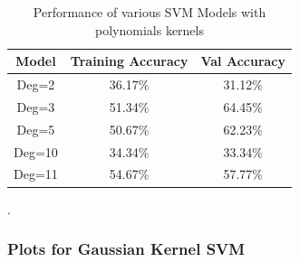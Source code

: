 \newpage
{
\begin{table}[!h]
\centering
\begin{tabular}{ |c|c|c|  }
\hline
\rowcolor{lightgray} Model & Training Accuracy & Val Accuracy\\
\hline
Deg=2 & 36.17$\%$  & 31.12$\%$  \\ 
\hline
Deg=3 & 51.34$\%$  & 64.45$\%$  \\ 
\hline
Deg=5 & 50.67$\%$  & 62.23$\%$  \\ 
\hline
Deg=10 & 34.34$\%$  & 33.34$\%$  \\ 
\hline
Deg=11 & 54.67$\%$  & 57.77$\%$  \\ 
\hline
\end{tabular}
\caption{Performance of various SVM Models with polynomials kernels}.
\label{table:3}
\end{table}
}

\subsubsection{Plots for Gaussian Kernel SVM}



